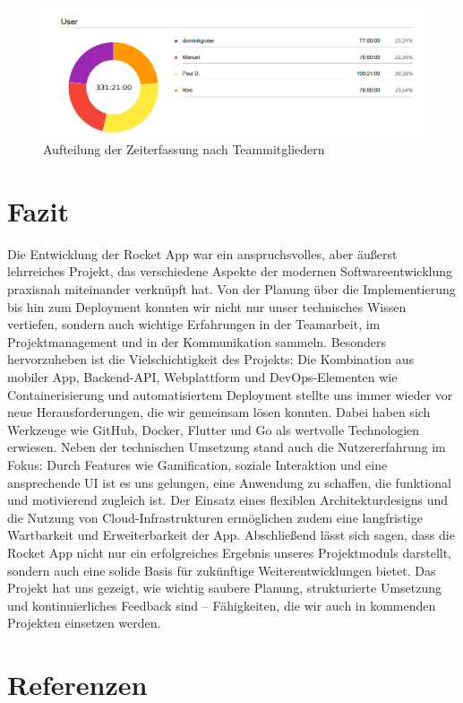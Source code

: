 \documentclass[11pt,a4paper]{article}
\begin{document}
\begin{figure}[H]
    \centering
    \includegraphics[width=\textwidth]{images/clockify_piechart.png}
    \caption{Aufteilung der Zeiterfassung nach Teammitgliedern}
    \label{fig:piechart}
\end{figure}
\newpage
\section{Fazit}
Die Entwicklung der Rocket App war ein anspruchsvolles, aber äußerst lehrreiches Projekt, das verschiedene Aspekte der modernen Softwareentwicklung praxisnah miteinander verknüpft hat.
Von der Planung über die Implementierung bis hin zum Deployment konnten wir nicht nur unser technisches Wissen vertiefen, sondern auch wichtige Erfahrungen in der Teamarbeit,
im Projektmanagement und in der Kommunikation sammeln.
Besonders hervorzuheben ist die Vielschichtigkeit des Projekts: Die Kombination aus mobiler App, Backend-API, Webplattform und DevOps-Elementen wie Containerisierung und automatisiertem Deployment
stellte uns immer wieder vor neue Herausforderungen, die wir gemeinsam lösen konnten. Dabei haben sich Werkzeuge wie GitHub, Docker, Flutter und Go als wertvolle Technologien erwiesen.
Neben der technischen Umsetzung stand auch die Nutzererfahrung im Fokus: Durch Features wie Gamification, soziale Interaktion und eine ansprechende UI ist es uns gelungen, eine Anwendung zu schaffen,
die funktional und motivierend zugleich ist. Der Einsatz eines flexiblen Architekturdesigns und die Nutzung von Cloud-Infrastrukturen ermöglichen zudem eine langfristige Wartbarkeit und Erweiterbarkeit der App.
Abschließend lässt sich sagen, dass die Rocket App nicht nur ein erfolgreiches Ergebnis unseres Projektmoduls darstellt, sondern auch eine solide Basis für zukünftige Weiterentwicklungen bietet.
Das Projekt hat uns gezeigt, wie wichtig saubere Planung, strukturierte Umsetzung und kontinuierliches Feedback sind – Fähigkeiten, die wir auch in kommenden Projekten einsetzen werden.
\newpage
\section{Referenzen}
\end{document}
